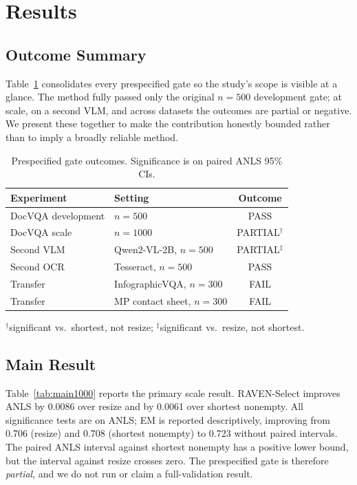 \documentclass[journal]{IEEEtran}
\begin{document}
\section{Results}
\subsection{Outcome Summary}
Table~\ref{tab:summary} consolidates every prespecified gate so the study's
scope is visible at a glance.  The method fully passed only the original
$n=500$ development gate; at scale, on a second VLM, and across datasets the
outcomes are partial or negative.  We present these together to make the
contribution honestly bounded rather than to imply a broadly reliable method.

\begin{table}[t]
\centering
\caption{Prespecified gate outcomes.  Significance is on paired ANLS 95\% CIs.}
\label{tab:summary}
\setlength{\tabcolsep}{4pt}
\begin{tabular}{llc}
\toprule
Experiment & Setting & Outcome\\
\midrule
DocVQA development & $n=500$ & PASS\\
DocVQA scale & $n=1000$ & PARTIAL$^{\dagger}$\\
Second VLM & Qwen2-VL-2B, $n=500$ & PARTIAL$^{\ddagger}$\\
Second OCR & Tesseract, $n=500$ & PASS\\
Transfer & InfographicVQA, $n=300$ & FAIL\\
Transfer & MP contact sheet, $n=300$ & FAIL\\
\bottomrule
\end{tabular}

\vspace{2pt}
{\footnotesize $^{\dagger}$significant vs.\ shortest, not resize;
$^{\ddagger}$significant vs.\ resize, not shortest.}
\end{table}

\subsection{Main Result}
Table~\ref{tab:main1000} reports the primary scale result.  RAVEN-Select
improves ANLS by 0.0086 over resize and by 0.0061 over shortest nonempty.  All
significance tests are on ANLS; EM is reported descriptively, improving from
0.706 (resize) and 0.708 (shortest nonempty) to 0.723 without paired intervals.
The paired ANLS interval against shortest nonempty has a positive lower bound,
but the interval against resize crosses zero.  The prespecified gate is
therefore \emph{partial}, and we do not run or claim a full-validation result.
\end{document}
